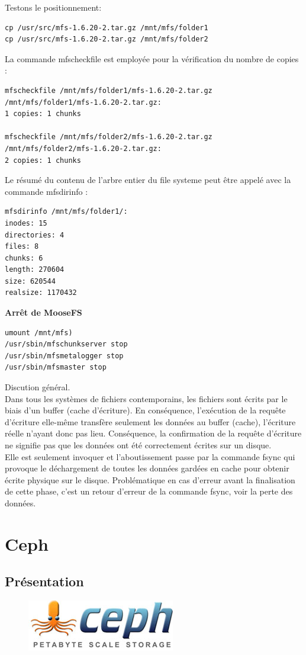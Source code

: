 \documentclass[12pt]{report}
\begin{document}
Testons le positionnement:
\begin{lstlisting}
cp /usr/src/mfs-1.6.20-2.tar.gz /mnt/mfs/folder1
cp /usr/src/mfs-1.6.20-2.tar.gz /mnt/mfs/folder2
	  \end{lstlisting}
\newpage
La commande mfscheckfile est employée pour la vérification du nombre de copies :
\begin{lstlisting}
mfscheckfile /mnt/mfs/folder1/mfs-1.6.20-2.tar.gz
/mnt/mfs/folder1/mfs-1.6.20-2.tar.gz:
1 copies: 1 chunks

mfscheckfile /mnt/mfs/folder2/mfs-1.6.20-2.tar.gz
/mnt/mfs/folder2/mfs-1.6.20-2.tar.gz:
2 copies: 1 chunks
	  \end{lstlisting}
Le résumé du contenu de l'arbre entier du file systeme peut être appelé avec la commande mfsdirinfo :
\begin{lstlisting}
mfsdirinfo /mnt/mfs/folder1/:
inodes: 15
directories: 4
files: 8
chunks: 6
length: 270604
size: 620544
realsize: 1170432
	  \end{lstlisting}
\textbf{Arrêt de MooseFS}\\
\begin{lstlisting}
umount /mnt/mfs)
/usr/sbin/mfschunkserver stop
/usr/sbin/mfsmetalogger stop
/usr/sbin/mfsmaster stop
	  \end{lstlisting}
Discution général.\\
Dans tous les systèmes de fichiers contemporains, les fichiers sont écrits par le biais d'un buffer (cache d'écriture). En conséquence, l'exécution de la requête d'écriture elle-même transfère seulement les données au buffer (cache), l'écriture réelle n'ayant donc pas lieu. Conséquence, la confirmation de la requête d'écriture ne signifie pas que les données ont été correctement écrites sur un disque.\\ Elle est seulement invoquer et l'aboutissement passe par la commande fsync qui provoque le déchargement de toutes les données gardées en cache pour obtenir écrite physique sur le disque. Problématique en cas d'erreur avant la finalisation de cette phase, c'est un retour d'erreur de la commande fsync, voir la perte des données. 
	\chapter{Ceph}
		\section{Présentation}

                        \begin{figure}[H]
				\begin{center}
					\includegraphics[width=0.40\linewidth]{images/cephfs.jpg}
				\end{center}
			\end{figure}
\end{document}
